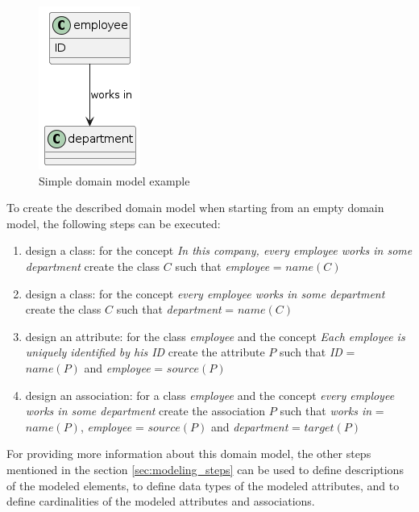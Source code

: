 \begin{figure}[!h]
    \centering
    \includegraphics[scale=0.65]{img/domain-modeling-steps-example.png}
    \caption{\centering Simple domain model example}
    \label{fig:simple-employee-domain-model}
\end{figure}

To create the described domain model when starting from an empty domain model, the following steps can be executed:

\begin{enumerate}
\item design a class: for the concept \textit{In this company, every employee works in some department} create the class $C$ such that \textit{employee} = $name(C)$
\item design a class: for the concept \textit{every employee works in some department} create the class $C$ such that \textit{department} = $name(C)$
\item design an attribute: for the class \textit{employee} and the concept \textit{Each employee is uniquely identified by his ID} create the attribute $P$ such that \textit{ID} = $name(P)$ and \textit{employee} = $source(P)$
\item design an association: for a class \textit{employee} and the concept \textit{every employee works in some department} create the association $P$ such that \textit{works in} = $name(P)$, \textit{employee} = $source(P)$ and \textit{department} = $target(P)$
\end{enumerate}

For providing more information about this domain model, the other steps mentioned in the section \ref{sec:modeling_steps} can be used to define descriptions of the modeled elements, to define data types of the modeled attributes, and to define cardinalities of the modeled attributes and associations.